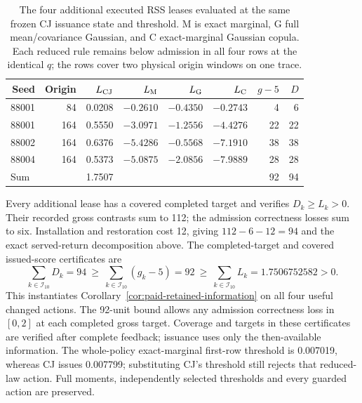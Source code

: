 \documentclass[10pt]{article}
\begin{document}
\begin{table}[t]
\centering\small
\caption{The four additional executed RSS leases evaluated at the same
frozen CJ issuance state and threshold. M is exact marginal, G full
mean/covariance Gaussian, and C exact-marginal Gaussian copula. Each reduced
rule remains below admission in all four rows at the identical $q$; the rows cover
two physical origin windows on one trace.}
\label{tab:rss-four-extra-leases}
\begin{tabular}{rr rrrrrr}
\toprule
Seed & Origin & $L_{\rm CJ}$ & $L_{\rm M}$ & $L_{\rm G}$ & $L_{\rm C}$ & $g-5$ & $D$\\
\midrule
88001 & 84 & 0.0208 & $-0.2610$ & $-0.4350$ & $-0.2743$ & 4 & 6\\
88001 & 164 & 0.5550 & $-3.0971$ & $-1.2556$ & $-4.4276$ & 22 & 22\\
88002 & 164 & 0.6376 & $-5.4286$ & $-0.5568$ & $-7.1910$ & 38 & 38\\
88004 & 164 & 0.5373 & $-5.0875$ & $-2.0856$ & $-7.9889$ & 28 & 28\\
\midrule
\multicolumn{2}{l}{Sum} & 1.7507 & & & & 92 & 94\\
\bottomrule
\end{tabular}
\end{table}

Every additional lease has a covered completed target and verifies
$D_k\geq L_k>0$. Their recorded gross contrasts sum to 112; the admission
correctness losses sum to six. Installation and restoration cost 12,
giving $112-6-12=94$ and the exact served-return decomposition above.
The completed-target and covered issued-score certificates are
\begin{equation}
 \sum_{k\in\mathcal I_{10}}D_k=94
 \ \geq\ \sum_{k\in\mathcal I_{10}}(g_k-5)=92
 \ \geq\ \sum_{k\in\mathcal I_{10}}L_k=1.7506752582>0.
 \label{eq:rss-additional-return-certificate}
\end{equation}
This instantiates Corollary~\ref{cor:paid-retained-information} on all four
useful changed actions. The 92-unit bound allows any admission correctness
loss in $[0,2]$ at each completed gross target. Coverage and targets in
these certificates are verified after complete feedback; issuance uses
only the then-available information. The whole-policy exact-marginal
first-row threshold is 0.007019, whereas CJ issues 0.007799; substituting
CJ's threshold still rejects that reduced-law action. Full moments,
independently selected thresholds and every guarded action are preserved.
\end{document}
